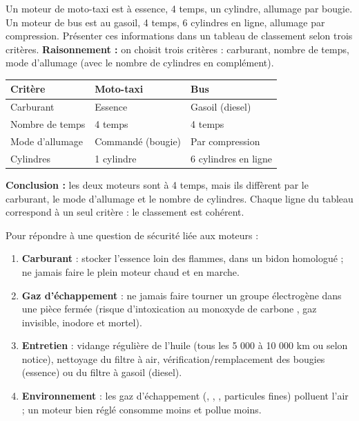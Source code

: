 \documentclass[11pt]{article}
\begin{document}
\begin{exoresolu}
Un moteur de moto-taxi est à essence, 4 temps, un cylindre, allumage par bougie. Un moteur de bus est au gasoil, 4 temps, 6 cylindres en ligne, allumage par compression. Présenter ces informations dans un tableau de classement selon trois critères.
\tcblower
\textbf{Raisonnement :} on choisit trois critères : carburant, nombre de temps, mode d'allumage (avec le nombre de cylindres en complément).
\begin{center}
\begin{tabularx}{\linewidth}{|l|X|X|}\hline
\rowcolor{popblueL} \textbf{Critère} & \textbf{Moto-taxi} & \textbf{Bus} \\ \hline
Carburant & Essence & Gasoil (diesel) \\ \hline
Nombre de temps & 4 temps & 4 temps \\ \hline
Mode d'allumage & Commandé (bougie) & Par compression \\ \hline
Cylindres & 1 cylindre & 6 cylindres en ligne \\ \hline
\end{tabularx}
\end{center}
\textbf{Conclusion :} les deux moteurs sont à 4 temps, mais ils diffèrent par le carburant, le mode d'allumage et le nombre de cylindres. Chaque ligne du tableau correspond à un seul critère : le classement est cohérent.
\end{exoresolu}

\begin{methode}
Pour répondre à une question de sécurité liée aux moteurs :
\begin{enumerate}
\item \textbf{Carburant} : stocker l'essence loin des flammes, dans un bidon homologué ; ne jamais faire le plein moteur chaud et en marche.
\item \textbf{Gaz d'échappement} : ne jamais faire tourner un groupe électrogène dans une pièce fermée (risque d'intoxication au monoxyde de carbone , gaz invisible, inodore et mortel).
\item \textbf{Entretien} : vidange régulière de l'huile (tous les 5 000 à 10 000 km ou selon notice), nettoyage du filtre à air, vérification/remplacement des bougies (essence) ou du filtre à gasoil (diesel).
\item \textbf{Environnement} : les gaz d'échappement (, , , particules fines) polluent l'air ; un moteur bien réglé consomme moins et pollue moins.
\end{enumerate}
\end{methode}
\end{document}
